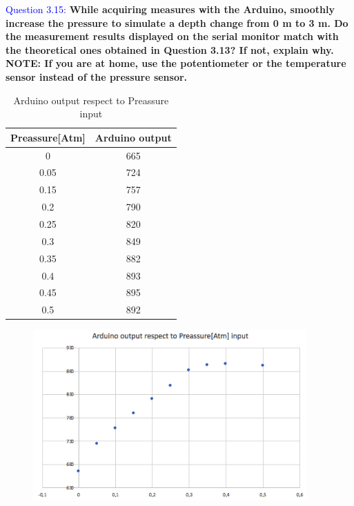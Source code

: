 \documentclass[12pt, a4papre]{article}
\begin{document}
	\textcolor{blue}{Question 3.15:}  \textbf{While acquiring measures with the Arduino, smoothly increase the pressure to simulate a depth change from 0 m to 3 m. Do the measurement results displayed on the serial monitor match with the theoretical ones obtained in Question 3.13? If not, explain why. NOTE: If you are at home, use the potentiometer or the temperature sensor instead of the pressure sensor.}

	\begin{table}[H]
	\centering
	\begin{tabular}{||c c ||} 
	 \hline
		 Preassure[Atm] & Arduino output \\ [0.5ex] 
	 \hline\hline
	 	 0 		& 665  \\
		 0.05		& 724  \\ 
		 0.15 	& 757  \\ 
		 0.2 		& 790  \\
		 0.25 	& 820  \\ 
		 0.3 		& 849  \\
		 0.35 	& 882  \\ 
		 0.4 		& 893  \\
		 0.45 	& 895  \\ 
		 0.5 		& 892  \\ [1ex] 
	 \hline
	\end{tabular}
	\caption{Arduino output respect to Preassure input}
	\end{table}
	
	\begin{figure}[H]
		\begin{center}
		\includegraphics[width=105mm]{ExcelGraph3.png}
		\end{center}
	\end{figure}
	
\end{document}

